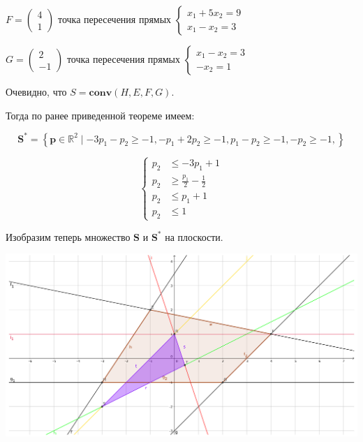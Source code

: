 \documentclass[a4paper,12pt]{article}
\newcommand{\lt}{\left}
\newcommand{\rt}{\right}
\begin{document}
	$F = \begin{pmatrix}
	4\\
	1
	\end{pmatrix}$ точка пересечения прямых
	$
	\lt\{\begin{aligned}
	x_1 + 5x_2 = 9  \\
	x_1 - x_2 = 3 
	\end{aligned}
	\rt.
	$
	
	$G = \begin{pmatrix}
	2\\
	-1
	\end{pmatrix}$ точка пересечения прямых
	$
	\lt\{\begin{aligned}
	x_1 - x_2 = 3  \\
	-x_2 = 1 
	\end{aligned}
	\rt.
	$
	
	Очевидно, что $S = \mathbf{conv}(H, E, F, G)$.
	
	Тогда по ранее приведенной теореме имеем:
	
	$$ \mathbf{S^*} = \left\{ \mathbf{p} \in \mathbb{R}^2 \mid -3p_1 -p_2\geq-1, -p_1 +2p_2\geq-1, p_1 -p_2\geq-1, -p_2\geq-1,   \right\}$$
	
	\[\left\{
	\begin{aligned}
		p_2 &\leq -3p_1 + 1  \\
		p_2 &\geq \frac{p_1}{2} -\frac{1}{2}\\
		p_2 &\le p_1 + 1\\
		p_2 &\le 1  
	\end{aligned}
	\right.
	\]
	
	
	Изобразим теперь множество $\textbf{S}$ и $ \mathbf{S^*}$ на плоскости.
	
	\includegraphics[width=\textwidth]{image2_problem2.pdf}
	
	
	\section{}
	
\end{document}

